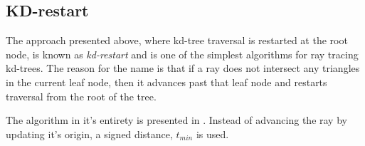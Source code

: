 \begin{figure}
{
    \label{fig:simpleTree}
  }
  \caption[A simple scene and its kd-tree.]{}
  \label{fig:simpleSceneTree}
\end{figure}


\subsection{KD-restart}\label{sec:kdRestart}


The approach presented above, where kd-tree traversal is restarted at
the root node, is known as \textit{kd-restart} and is one of the
simplest algorithms for ray tracing kd-trees. The reason for the name
is that if a ray does not intersect any triangles in the current leaf
node, then it advances past that leaf node and restarts traversal from
the root of the tree.


The algorithm in it's entirety is presented in
. Instead of advancing the ray by updating it's
origin, a signed distance, $t_{min}$ is used.


